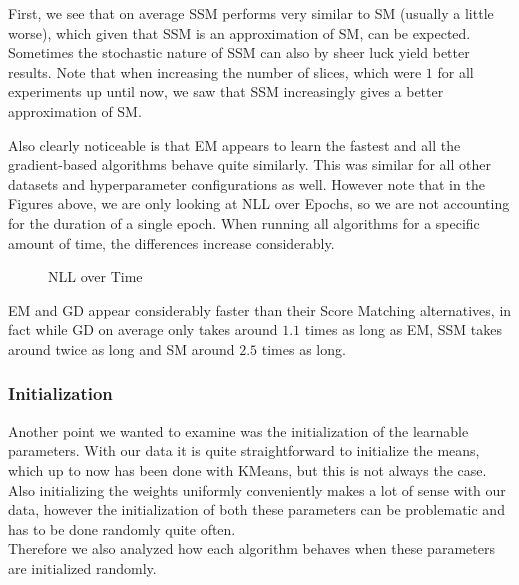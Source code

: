 First, we see that on average SSM performs very similar to SM (usually a little worse), which 
given that SSM is an approximation of SM, can be expected. Sometimes the stochastic nature of SSM can also 
by sheer luck yield better results. Note that when increasing the number of slices, which were $1$ for all 
experiments up until now, we saw that SSM increasingly gives a better approximation of SM.

Also clearly noticeable is that EM appears to learn the fastest and all the gradient-based algorithms
behave quite similarly. This was similar for all other datasets and hyperparameter configurations as well. 
However note that in the Figures above, we are only looking at NLL over Epochs, so we are not accounting for the 
duration of a single epoch. When running all algorithms for a specific amount of time, the differences increase considerably. 

\begin{figure}[H]
    \centering
    \caption{NLL over Time}
    \label{fig:spirals_30_kmeans}
\end{figure}

EM and GD appear considerably faster than their Score Matching alternatives, in fact while GD on average only takes 
around $1.1$ times as long as EM, SSM takes around twice as long and SM around $2.5$ times as long.

\subsubsection{Initialization}
\label{sec:2d_exp3}

Another point we wanted to examine was the initialization of the learnable parameters. 
With our data it is quite straightforward to initialize the means, which up to now has been done with KMeans, but this is not always the case.
Also initializing the weights uniformly conveniently makes a lot of sense with our data, however the initialization of both these 
parameters can be problematic and has to be done randomly quite often. \\
Therefore we also analyzed how each algorithm 
behaves when these parameters are initialized randomly. 

